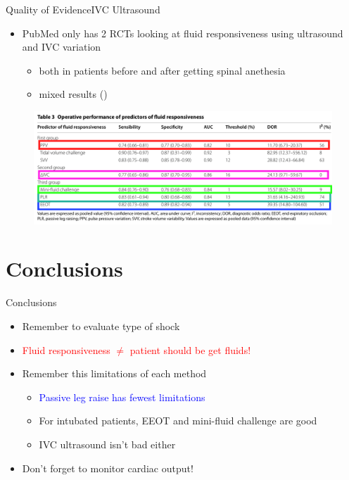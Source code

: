 \documentclass{beamer}
\newcommand{\pro}{\textcolor{blue}}
\newcommand{\con}{\textcolor{red}}
\begin{document}
			\begin{frame}{Quality of Evidence}{IVC Ultrasound}
				\begin{itemize}
					\item PubMed only has 2 RCTs looking at fluid responsiveness using ultrasound and IVC variation
						\begin{itemize}
							\item both in patients before and after getting spinal anethesia
							\item mixed results (\cite{Ceruti2018,Tawfik2019})
						\end{itemize}
				\end{itemize}
				\begin{figure}
					\centering
					\includegraphics[width=0.9\linewidth]{figures/responsivenessMethodsCompared-all}
					\label{fig:responsivenessmethodscompared-all}
				\end{figure}
			\end{frame}
	
	\section{Conclusions}
		\begin{frame}{Conclusions}
			\begin{itemize}
				\item Remember to evaluate type of shock
				\item \con{Fluid responsiveness $\neq$ patient should be get fluids!}
				\item Remember this limitations of each method
					\begin{itemize}
						\item \pro{Passive leg raise has fewest limitations}
						\item For intubated patients, EEOT and mini-fluid challenge are good
						\item IVC ultrasound isn't bad either
					\end{itemize}
				\item Don't forget to monitor cardiac output!
			\end{itemize}
		\end{frame}
\end{document}
